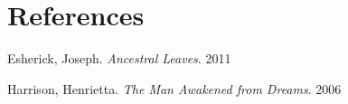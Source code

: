 \section*{References}

\bibent Esherick, Joseph. \textit{Ancestral Leaves}. 2011

\bibent Harrison, Henrietta. \textit{The Man Awakened from Dreams}. 2006
